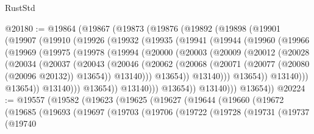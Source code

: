 \begin{lexlean}{RustStd}
\begin{coremodule}
@20180 := @19864
    (@19867
      (@19873
        (@19876
          (@19892
            (@19898
              (@19901
                (@19907
                  (@19910
                    (@19926
                      (@19932
                        (@19935
                          (@19941
                            (@19944
                              (@19960
                                (@19966
                                  (@19969
                                    (@19975
                                      (@19978
                                        (@19994
                                          (@20000
                                            (@20003
                                              (@20009
                                                (@20012
                                                  (@20028
                                                    (@20034
                                                      (@20037
                                                        (@20043
                                                          (@20046
                                                            (@20062
                                                              (@20068
                                                                (@20071
                                                                  (@20077
                                                                    (@20080 (@20096 @20132))
                                                                    @13654))
                                                                @13140)))
                                                          @13654))
                                                      @13140)))
                                                @13654))
                                            @13140)))
                                      @13654))
                                  @13140)))
                            @13654))
                        @13140)))
                  @13654))
              @13140)))
        @13654))
@20224 := @19557
    (@19582
      (@19623
        (@19625
          (@19627
            (@19644
              (@19660
                (@19672
                  (@19685
                    (@19693
                      (@19697
                        (@19703
                          (@19706
                            (@19722
                              (@19728
                                (@19731
                                  (@19737
                                    (@19740

\end{coremodule}
\end{lexlean}
